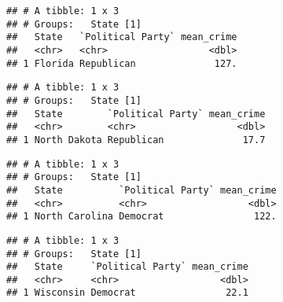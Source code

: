 \documentclass[]{article}
\newenvironment{Shaded}{\begin{snugshade}}{\end{snugshade}}
\newcommand{\CommentTok}[1]{\textcolor[rgb]{0.56,0.35,0.01}{\textit{#1}}}
\newcommand{\KeywordTok}[1]{\textcolor[rgb]{0.13,0.29,0.53}{\textbf{#1}}}
\newcommand{\NormalTok}[1]{#1}
\newcommand{\OperatorTok}[1]{\textcolor[rgb]{0.81,0.36,0.00}{\textbf{#1}}}
\begin{document}
\begin{verbatim}
## # A tibble: 1 x 3
## # Groups:   State [1]
##   State   `Political Party` mean_crime
##   <chr>   <chr>                  <dbl>
## 1 Florida Republican              127.
\end{verbatim}

\begin{Shaded}
\end{Shaded}

\begin{verbatim}
## # A tibble: 1 x 3
## # Groups:   State [1]
##   State        `Political Party` mean_crime
##   <chr>        <chr>                  <dbl>
## 1 North Dakota Republican              17.7
\end{verbatim}

\begin{Shaded}
\end{Shaded}

\begin{verbatim}
## # A tibble: 1 x 3
## # Groups:   State [1]
##   State          `Political Party` mean_crime
##   <chr>          <chr>                  <dbl>
## 1 North Carolina Democrat                122.
\end{verbatim}

\begin{Shaded}
\end{Shaded}

\begin{verbatim}
## # A tibble: 1 x 3
## # Groups:   State [1]
##   State     `Political Party` mean_crime
##   <chr>     <chr>                  <dbl>
## 1 Wisconsin Democrat                22.1
\end{verbatim}
\end{document}
